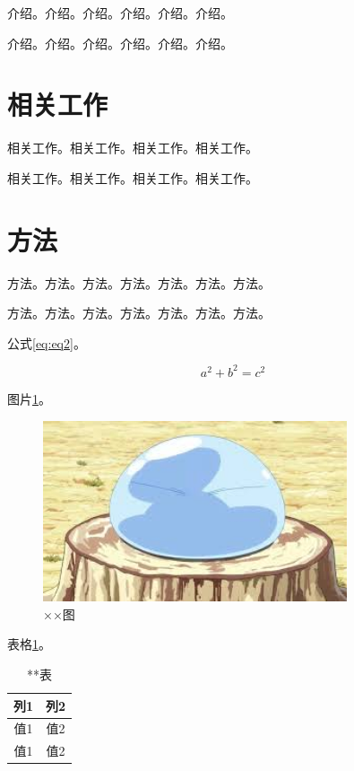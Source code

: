 \documentclass{csuthesis}
\begin{document}
    介绍。介绍。介绍。介绍。介绍。介绍。

    介绍。介绍。介绍。介绍。介绍。介绍。

    \section{相关工作}
    相关工作。相关工作。相关工作。相关工作。

    相关工作。相关工作。相关工作。相关工作。

    \section{方法}
    方法。方法。方法。方法。方法。方法。方法。

    方法。方法。方法。方法。方法。方法。方法。

    公式\ref{eq:eq2}。

    \begin{equation}
        a^2 + b^2 = c^2 \label{eq:eq2}
    \end{equation}

    图片\ref{fig:image2}。
    \begin{figure}
        \centering
        \includegraphics[width=0.8\textwidth]{images/image.jpeg}
        \caption{××图}
        \label{fig:image2}
    \end{figure}

    表格\ref{tab:table2}。
    \begin{table}
        \centering
        \caption{**表}
        \label{tab:table2}
        \begin{tabular}{c|c}
            \hline
            列1 & 列2 \\
            \hline
            值1 & 值2 \\
            值1 & 值2 \\
            \hline
        \end{tabular}
    \end{table}
\end{document}
